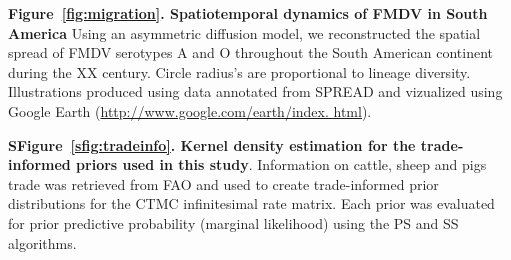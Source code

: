 \documentclass[10pt]{article}
\begin{document}
{\bf Figure~\ref{fig:migration}. Spatiotemporal dynamics of FMDV in South America} Using an asymmetric diffusion model, we reconstructed the spatial spread of FMDV serotypes A and O throughout the South American continent during the XX century. Circle radius's are proportional to lineage diversity. Illustrations produced using data annotated from SPREAD \cite{spread} and vizualized using Google Earth (\url{http://www.google.com/earth/index.
html}).

{\bf SFigure~\ref{sfig:tradeinfo}. Kernel density estimation for the trade-informed priors used in this study}. Information on cattle, sheep and pigs trade was retrieved from FAO and used to create trade-informed prior distributions for the CTMC infinitesimal rate matrix. Each prior was evaluated for prior predictive probability (marginal likelihood) using the PS and SS algorithms.

\newpage
\end{document}
